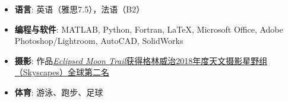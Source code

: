 	\begin{itemize}[leftmargin=*,itemsep= 4 pt,topsep = 2.2 pt, parsep = 0 pt]
		\item \textbf{语言}: 英语（雅思7.5），法语（B2）
		\item \textbf{编程与软件}: MATLAB, Python, Fortran, \LaTeX, Microsoft Office, Adobe Photoshop/Lightroom, AutoCAD, SolidWorks
	\end{itemize}

	\begin{itemize}[leftmargin=*,itemsep= 4 pt,topsep = 2.2 pt, parsep = 0 pt]
		\item \textbf{摄影}: 作品\href{https://www.rmg.co.uk/whats-on/astronomy-photographer-year/galleries/2018/skyscapes}{\textit{Eclipsed Moon Trail}获得格林威治2018年度天文摄影星野组（Skyscapes）全球第二名}
		\item \textbf{体育}: 游泳、跑步、足球
	\end{itemize}